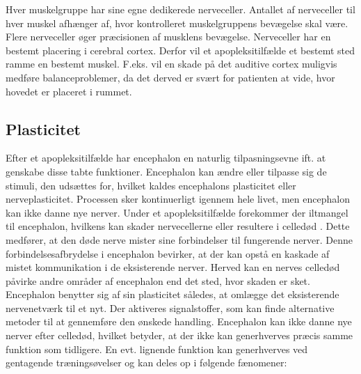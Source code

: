 Hver muskelgruppe har sine egne dedikerede nerveceller. Antallet af nerveceller til hver muskel afhænger af, hvor kontrolleret muskelgruppens bevægelse skal være. Flere nerveceller øger præcisionen af musklens bevægelse. \cite{Stanfield2014} Nerveceller har en bestemt placering i cerebral cortex. Derfor vil et apopleksitilfælde et bestemt sted ramme en bestemt muskel. F.eks. vil en skade på det auditive cortex muligvis medføre balanceproblemer, da det derved er svært for patienten at vide, hvor hovedet er placeret i rummet. \cite{Mao2014} %

\subsection{Plasticitet}
Efter et apopleksitilfælde har encephalon en naturlig tilpasningsevne ift. at genskabe disse tabte funktioner. Encephalon kan ændre eller tilpasse sig de stimuli, den udsættes for, hvilket kaldes encephalons plasticitet eller nerveplasticitet. Processen sker kontinuerligt igennem hele livet, men encephalon kan ikke danne nye nerver. \cite{Stanfield2014} Under et apopleksitilfælde forekommer der iltmangel til encephalon, hvilkens kan skader nervecellerne eller resultere i celledød \cite{Schulze2011}. Dette medfører, at den døde nerve mister sine forbindelser til fungerende nerver. Denne forbindelsesafbrydelse i encephalon bevirker, at der kan opstå en kaskade af mistet kommunikation i de eksisterende nerver. Herved kan en nerves celledød påvirke andre områder af encephalon end det sted, hvor skaden er sket. \cite{Raine2009} Encephalon benytter sig af sin plasticitet således, at omlægge det eksisterende nervenetværk til et nyt. Der aktiveres signalstoffer, som kan finde alternative metoder til at gennemføre den ønskede handling. \cite{Rugnett2015} Encephalon kan ikke danne nye nerver efter celledød, hvilket betyder, at der ikke kan generhverves præcis samme funktion som tidligere. En evt. lignende funktion kan generhverves ved gentagende træningsøvelser og kan deles op i følgende fænomener: \cite{Raine2009}

